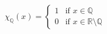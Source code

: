 \documentclass{article}
\begin{document}
$\chi_{\mathbb{Q}}(x)=
    \begin{cases}
        1 & \text{if } x \in \mathbb{Q}\\
        0 & \text{if } x \in \mathbb{R}\setminus\mathbb{Q}
    \end{cases}$
\end{document}
